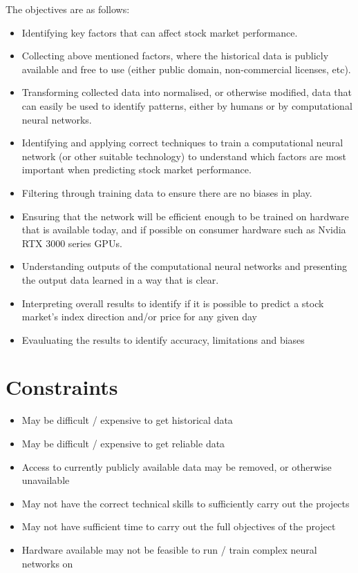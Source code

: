 The objectives are as follows:
\begin{itemize}
    \item Identifying key factors that can affect stock market performance.
    \item Collecting above mentioned factors, where the historical data is publicly available and free to use (either public domain, non-commercial licenses, etc).
    \item Transforming collected data into normalised, or otherwise modified, data that can easily be used to identify patterns, either by humans or by computational neural networks.
    \item Identifying and applying correct techniques to train a computational neural network (or other suitable technology) to understand which factors are most important when predicting stock market performance.
    \item Filtering through training data to ensure there are no biases in play.
    \item Ensuring that the network will be efficient enough to be trained on hardware that is available today, and if possible on consumer hardware such as Nvidia RTX 3000 series GPUs.
    \item Understanding outputs of the computational neural networks and presenting the output data learned in a way that is clear.
    \item Interpreting overall results to identify if it is possible to predict a stock market's index direction and/or price for any given day
    \item Evauluating the results to identify accuracy, limitations and biases
\end{itemize}

\section{Constraints}
\begin{itemize}
    \item May be difficult / expensive to get historical data
    \item May be difficult / expensive to get reliable data
    \item Access to currently publicly available data may be removed, or otherwise unavailable
    \item May not have the correct technical skills to sufficiently carry out the projects
    \item May not have sufficient time to carry out the full objectives of the project
    \item Hardware available may not be feasible to run / train complex neural networks on
\end{itemize}

